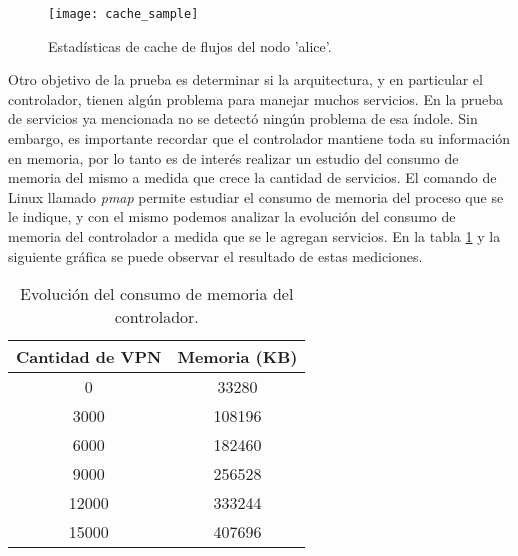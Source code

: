\begin{figure}[H]
	\caption{Estadísticas de cache de flujos del nodo 'alice'.}
	\texttt{[image: cache\_sample]}
	\centering
	\label{fig:cache_sample}
\end{figure}

Otro objetivo de la prueba es determinar si la arquitectura, y en particular el controlador, tienen algún problema para manejar muchos servicios. En la prueba de servicios ya mencionada no se detectó ningún problema de esa índole. Sin embargo, es importante recordar que el controlador mantiene toda su información en memoria, por lo tanto es de interés realizar un estudio del consumo de memoria del mismo a medida que crece la cantidad de servicios. El comando de Linux llamado \textit{pmap} permite estudiar el consumo de memoria del proceso que se le indique, y con el mismo podemos analizar la evolución del consumo de memoria del controlador a medida que se le agregan servicios. En la tabla \ref{table:consumo_de_memoria} y la siguiente gráfica se puede observar el resultado de estas mediciones. \\

\begin{table}[ht]
	\caption{Evolución del consumo de memoria del controlador.}
	\centering 
	\begin{tabular}{c c}
		\hline\hline
		Cantidad de VPN & Memoria (KB) \\ [0.5ex]
		\hline
		0 & 33280 \\
		3000 & 108196 \\
		6000 & 182460 \\
		9000 & 256528 \\
		12000 & 333244 \\
		15000 & 407696 \\ [1ex]
		\hline
	\end{tabular}
	\label{table:consumo_de_memoria}
\end{table}



